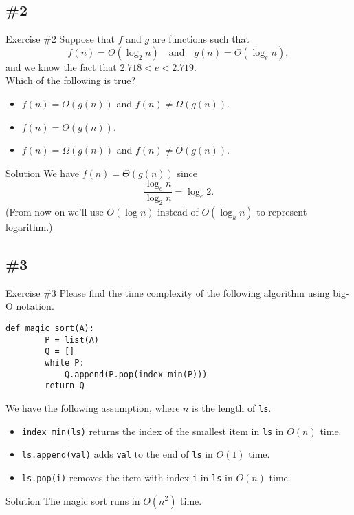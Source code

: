 \documentclass{beamer}
\begin{document}
\subsection{\#2}
\begin{frame}{Exercise \#2}
  Suppose that $f$ and $g$ are functions such that
  \begin{equation*}
    f(n) = \Theta(\log_2 n)
    \quad \text{and} \quad
    g(n) = \Theta(\log_e n),
  \end{equation*}
  and we know the fact that $2.718 < e < 2.719$. \\[.5em] \pause
  Which of the following is true? \pause
  \begin{itemize}
    \item $f(n) = O(g(n))$ and $f(n) \neq \Omega(g(n))$. \pause
    \item $f(n) = \Theta(g(n))$. \pause
    \item $f(n) = \Omega(g(n))$ and $f(n) \neq O(g(n))$. \pause
  \end{itemize}
  \begin{block}{Solution}
    \small
    We have $f(n) = \Theta(g(n))$ since
    \begin{equation*}
      \frac{\log_e n}{\log_2 n} = \log_e 2.
    \end{equation*}
    (From now on we'll use $O(\log n)$ instead of $O(\log_k n)$ to represent
    logarithm.)
  \end{block}
\end{frame}

\subsection{\#3}
\begin{frame}[fragile]{Exercise \#3}
  Please find the time complexity of the following algorithm using big-O
  notation. \pause
  \begin{block}{}
    \scriptsize
    \begin{lstlisting}[gobble=4]
    def magic_sort(A):
        P = list(A)
        Q = []
        while P:
            Q.append(P.pop(index_min(P)))
        return Q
    \end{lstlisting}
    \pause
  \end{block}
  We have the following assumption, where $n$ is the length of \lstinline{ls}.
  \pause
  \begin{itemize}
    \item \lstinline{index_min(ls)} returns the index of the smallest item in
    \lstinline{ls} in $O(n)$ time. \pause
    \item \lstinline{ls.append(val)} adds \lstinline{val} to the end of
    \lstinline{ls} in $O(1)$ time. \pause
    \item \lstinline{ls.pop(i)} removes the item with index \lstinline{i}
    in \lstinline{ls} in $O(n)$ time. \pause
  \end{itemize}
  \begin{block}{Solution}
    The magic sort runs in $O(n^2)$ time.
  \end{block}
\end{frame}
\end{document}
